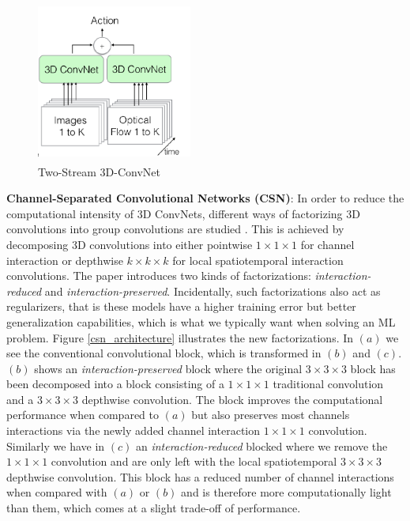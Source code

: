\documentclass[extern,palatino]{cgMA}
\begin{document}
\begin{figure}[h]
\center
\includegraphics[height={150pt}, width={145pt}]{images/i3d_architecture.png}
\caption{Two-Stream 3D-ConvNet \cite{carreira2017quo}}
\label{i3d_architecture}
\end{figure}

\bigskip
\noindent\textbf{Channel-Separated Convolutional Networks (CSN)}: In order to reduce the computational intensity of 3D ConvNets, different ways of factorizing 3D convolutions into group convolutions are studied \cite{tran2019video}. This is achieved by decomposing 3D convolutions into either pointwise $1 \times 1 \times 1$ for channel interaction or depthwise $k \times k \times k$ for local spatiotemporal interaction convolutions. The paper introduces two kinds of factorizations: \textit{interaction-reduced} and \textit{interaction-preserved}. Incidentally, such factorizations also act as regularizers, that is these models have a higher training error but better generalization capabilities, which is what we typically want when solving an ML problem. Figure \ref{csn_architecture} illustrates the new factorizations. In $(a)$ we see the conventional convolutional block, which is transformed in $(b)$ and $(c)$. $(b)$ shows an \textit{interaction-preserved} block where the original $3 \times 3 \times 3$ block has been decomposed into a block consisting of a $1 \times 1 \times 1$ traditional convolution and a $3 \times 3 \times 3$ depthwise convolution. The block improves the computational performance when compared to $(a)$ but also preserves most channels interactions via the newly added channel interaction $1 \times 1 \times 1$ convolution. Similarly we have in $(c)$ an \textit{interaction-reduced} blocked where we remove the $1 \times 1 \times 1$ convolution and are only left with the local spatiotemporal $3 \times 3 \times 3$ depthwise convolution. This block has a reduced number of channel interactions when compared with $(a)$ or $(b)$ and is therefore more computationally light than them, which comes at a slight trade-off of performance.
\end{document}
